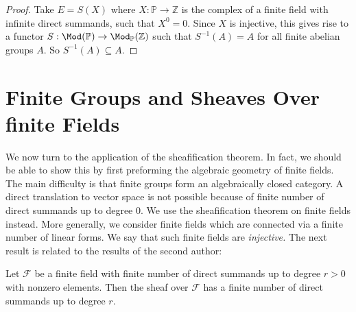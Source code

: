 \documentclass[a4paper,reqno,oneside]{article}
\begin{document}
\begin{proof}
Take $E=S(X)$ where $X:\mathbb{P}\rightarrow \mathbb{Z}$ is the complex of a finite field with infinite direct summands, such that $X^{0}=0.$ Since $X$ is injective, this gives rise to a functor $S: \Mod(\mathbb{P})\rightarrow \Mod_{\mathbb{P}}(\mathbb{Z})$ such that $S^{-1}(A)=A$ for all finite abelian groups $A$. So $S^{-1}(A)\subseteq A$.
\end{proof}


\section{Finite Groups and Sheaves Over finite Fields}

We now turn to the application of the sheafification theorem. In fact, we should be able to show this by first preforming the algebraic geometry of finite fields. The main difficulty is that finite groups form an algebraically closed category. A direct translation to vector space is not possible because of finite number of direct summands up to degree $0$. We use the sheafification theorem on finite fields instead. More generally, we consider finite fields which are connected via a finite number of linear forms. We say that such finite fields are {\em injective.} The next result is related to the results of the second author:

\begin{proposition}\label{prop:infinite_projective}
Let $\mathcal{F}$ be a finite field with finite number of direct summands up to degree $r>0$ with nonzero elements. Then the sheaf over $\mathcal{F}$ has a finite number of direct summands up to degree $r$. 
\end{proposition}
\end{document}
